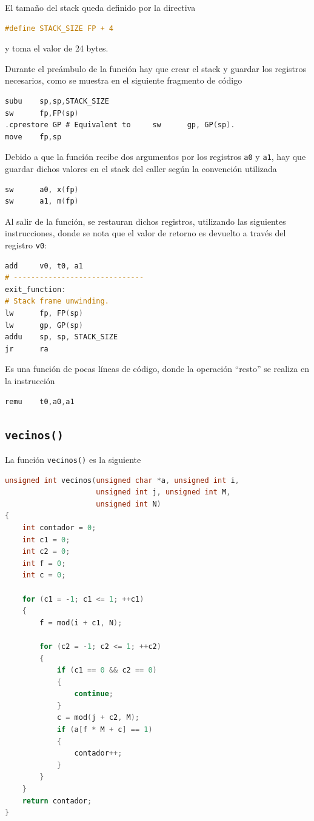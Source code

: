 \documentclass[a4paper,12pt]{article}
\newcommand{\quotes}[1]{``#1''}
\numberwithin{equation}{section}
\numberwithin{figure}{section}
\begin{document}
El tamaño del stack queda definido por la directiva
\begin{lstlisting}[language=C, style=StyleC]
#define STACK_SIZE FP + 4
\end{lstlisting}
y toma el valor de \SI{24}{} bytes.

Durante el preámbulo de la función hay que crear el stack y guardar los registros necesarios, como se muestra en el siguiente fragmento de código
\begin{lstlisting}[language=C, style=StyleC]
subu	sp,sp,STACK_SIZE
sw	    fp,FP(sp)
.cprestore GP # Equivalent to     sw      gp, GP(sp).
move    fp,sp
\end{lstlisting}

Debido a que la función recibe dos argumentos por los registros \texttt{a0} y \texttt{a1}, hay que guardar dichos valores en el stack del caller según la convención utilizada
\begin{lstlisting}[language=C, style=StyleC]
sw      a0, x(fp)
sw      a1, m(fp)
\end{lstlisting}

Al salir de la función, se restauran dichos registros, utilizando las siguientes instrucciones, donde se nota que el valor de retorno es devuelto a través del registro \texttt{v0}:
\begin{lstlisting}[language=C, style=StyleC]
add		v0, t0, a1
# ------------------------------
exit_function:
# Stack frame unwinding.
lw      fp, FP(sp)
lw      gp, GP(sp)
addu    sp, sp, STACK_SIZE
jr      ra
\end{lstlisting}

Es una función de pocas líneas de código, donde la operación \quotes{resto} se realiza en la instrucción
\begin{lstlisting}[language=C, style=StyleC]
remu    t0,a0,a1
\end{lstlisting}

\subsection{\texttt{vecinos()}}

La función \texttt{vecinos()} es la siguiente
\begin{lstlisting}[language=C, style=StyleC]
unsigned int vecinos(unsigned char *a, unsigned int i,
                     unsigned int j, unsigned int M,
                     unsigned int N)
{
	int contador = 0;
	int c1 = 0;
	int c2 = 0;
	int f = 0;
	int c = 0;

	for (c1 = -1; c1 <= 1; ++c1)
	{
		f = mod(i + c1, N);

		for (c2 = -1; c2 <= 1; ++c2)
		{
			if (c1 == 0 && c2 == 0)
			{
				continue;
			}
			c = mod(j + c2, M);
			if (a[f * M + c] == 1)
			{
				contador++;
			}
		}
	}
	return contador;
}
\end{lstlisting}
\end{document}
